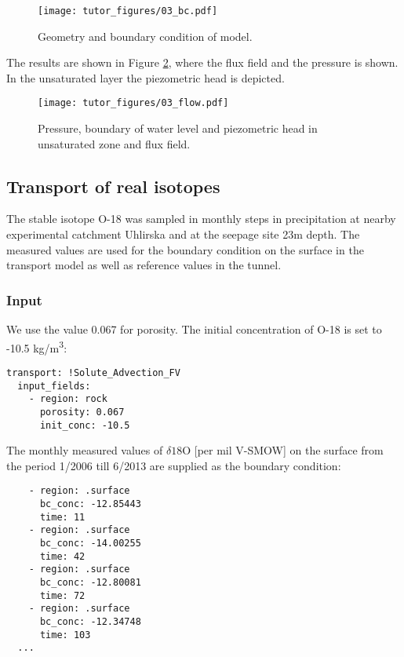 \begin{figure}
\hypertarget{fig:tunnel_geom}{%
\centering
\texttt{[image: tutor\_figures/03\_bc.pdf]}
\caption{Geometry and boundary condition of
model.}\label{fig:tunnel_geom}
}
\end{figure}

The results are shown in Figure \ref{fig:flow}, where the flux field and
the pressure is shown. In the unsaturated layer the piezometric head is
depicted.

\begin{figure}
\hypertarget{fig:flow}{%
\centering
\texttt{[image: tutor\_figures/03\_flow.pdf]}
\caption{Pressure, boundary of water level and piezometric head in
unsaturated zone and flux field.}\label{fig:flow}
}
\end{figure}

\subsection{Transport of real isotopes}

The stable isotope O-18 was sampled in monthly steps in precipitation at
nearby experimental catchment Uhlirska and at the seepage site 23m
depth. The measured values are used for the boundary condition on the
surface in the transport model as well as reference values in the
tunnel.

\subsubsection{Input}

We use the value 0.067 for porosity. The initial concentration of O-18
is set to -10.5 kg/m\textsuperscript{3}:

\begin{verbatim}
transport: !Solute_Advection_FV
  input_fields:
    - region: rock
      porosity: 0.067
      init_conc: -10.5
\end{verbatim}

The monthly measured values of \(\delta18\text{O}\) {[}per mil V-SMOW{]}
on the surface from the period 1/2006 till 6/2013 are supplied as the
boundary condition:

\begin{verbatim}
    - region: .surface
      bc_conc: -12.85443
      time: 11
    - region: .surface
      bc_conc: -14.00255
      time: 42
    - region: .surface
      bc_conc: -12.80081
      time: 72
    - region: .surface
      bc_conc: -12.34748
      time: 103
  ...
\end{verbatim}


